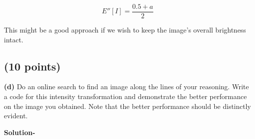 \documentclass{article}
\begin{document}
\begin{equation}E''[I] = \frac{0.5+a}{2}\end{equation}

This might be a good approach if we wish to keep the image’s overall
brightness intact.

\subsection{(10 points)}
\textbf{(d)} Do an online search to find an image along the lines of your reasoning.
Write a code for this intensity transformation and demonstrate the better
performance on the image you obtained. Note that the better performance
should be distinctly evident.

\textbf{Solution-}
\end{document}
